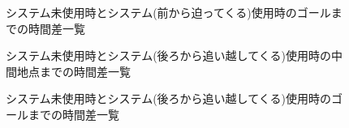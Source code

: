 \begin{figure}[H]
    \centering
    \caption{システム未使用時とシステム(前から迫ってくる)使用時のゴールまでの時間差一覧}
    \label{fig:maetime}
\end{figure}
\begin{figure}[H]
    \centering
    \caption{システム未使用時とシステム(後ろから追い越してくる)使用時の中間地点までの時間差一覧}
    \label{fig:usirohalf}
\end{figure}
\begin{figure}[H]
    \centering
    \caption{システム未使用時とシステム(後ろから追い越してくる)使用時のゴールまでの時間差一覧}
    \label{fig:usirotime}
\end{figure}
